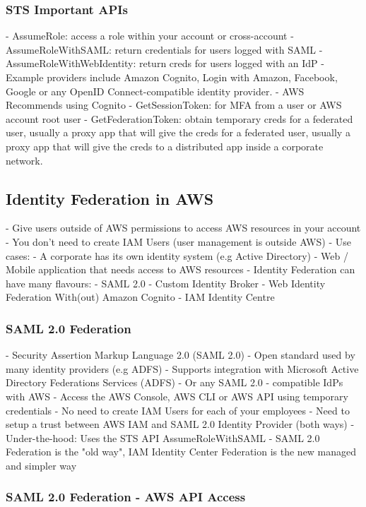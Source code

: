 \documentclass[11pt]{book}
\begin{document}
    \subsubsection{STS Important APIs}
    - AssumeRole: access a role within your account or cross-account
    - AssumeRoleWithSAML: return credentials for users logged with SAML
    - AssumeRoleWithWebIdentity: return creds for users logged with an IdP
    - Example providers include Amazon Cognito, Login with Amazon, Facebook, Google or any OpenID Connect-compatible identity provider.
    - AWS Recommends using Cognito
    - GetSessionToken: for MFA from a user or AWS account root user
    - GetFederationToken: obtain temporary creds for a federated user, usually a proxy app that will give the creds for a federated user, usually a proxy app that will give the creds to a distributed app inside a corporate network.

    \subsection{Identity Federation in AWS}
    - Give users outside of AWS permissions to access AWS resources in your account
    - You don't need to create IAM Users (user management is outside AWS)
    - Use cases:
    - A corporate has its own identity system (e.g Active Directory)
    - Web / Mobile application that needs access to AWS resources
    - Identity Federation can have many flavours:
    - SAML 2.0
    - Custom Identity Broker
    - Web Identity Federation With(out) Amazon Cognito
    - IAM Identity Centre

    \subsubsection{SAML 2.0 Federation}
    - Security Assertion Markup Language 2.0 (SAML 2.0)
    - Open standard used by many identity providers (e.g ADFS)
    - Supports integration with Microsoft Active Directory Federations Services (ADFS)
    - Or any SAML 2.0 - compatible IdPs with AWS
    - Access the AWS Console, AWS CLI or AWS API using temporary credentials
    - No need to create IAM Users for each of your employees
    - Need to setup a trust between AWS IAM and SAML 2.0 Identity Provider (both ways)
    - Under-the-hood: Uses the STS API AssumeRoleWithSAML
    - SAML 2.0 Federation is the "old way", IAM Identity Center Federation is the new managed and simpler way

    \subsubsection{SAML 2.0 Federation - AWS API Access}
\end{document}
